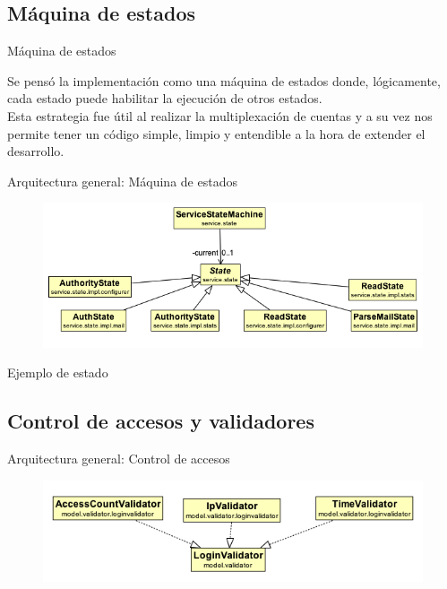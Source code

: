 \documentclass{beamer}
\begin{document}
\subsection{Máquina de estados}
\begin{frame}{Máquina de estados}
\par Se pensó la implementación como una máquina de estados donde, lógicamente, cada estado puede habilitar la ejecución de otros estados.\\[0.5cm]
Esta estrategia fue útil al realizar la multiplexación de cuentas y a su vez nos permite tener un código simple, limpio y entendible a la hora de extender el desarrollo.
\end{frame}

\begin{frame}{Arquitectura general: Máquina de estados}
\begin{figure}[H]
\begin{center}
\includegraphics[scale=0.52]{images/Estados.png}
\end{center}
\end{figure}
\end{frame}

\begin{frame}
\par Ejemplo de estado

\end{frame}

\subsection{Control de accesos y validadores}

\begin{frame}{Arquitectura general: Control de accesos}
\begin{figure}[H]
\begin{center}
\includegraphics[scale=0.6]{images/Validators.png}
\end{center}
\end{figure}
\end{frame}
\end{document}
